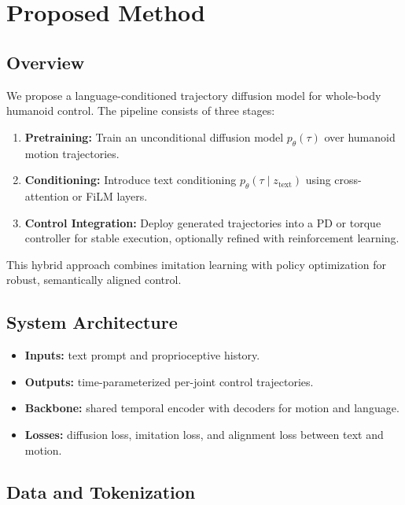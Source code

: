 \section{Proposed Method}
\label{sec:method}

\subsection{Overview}

We propose a language-conditioned trajectory diffusion model for whole-body humanoid control. 
The pipeline consists of three stages:

\begin{enumerate}
    \item \textbf{Pretraining:} Train an unconditional diffusion model $p_\theta(\tau)$ over humanoid motion trajectories.
    \item \textbf{Conditioning:} Introduce text conditioning $p_\theta(\tau \mid z_{\text{text}})$ using cross-attention or FiLM layers.
    \item \textbf{Control Integration:} Deploy generated trajectories into a PD or torque controller for stable execution, optionally refined with reinforcement learning.
\end{enumerate}

This hybrid approach combines imitation learning with policy optimization for robust, semantically aligned control.

\subsection{System Architecture}

\begin{itemize}
    \item \textbf{Inputs:} text prompt and proprioceptive history.
    \item \textbf{Outputs:} time-parameterized per-joint control trajectories.
    \item \textbf{Backbone:} shared temporal encoder with decoders for motion and language.
    \item \textbf{Losses:} diffusion loss, imitation loss, and alignment loss between text and motion.
\end{itemize}

\subsection{Data and Tokenization}

